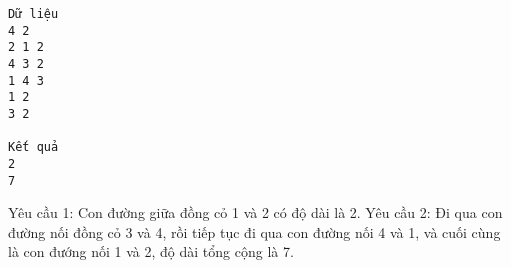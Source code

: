 \begin{verbatim}
Dữ liệu
4 2
2 1 2
4 3 2
1 4 3
1 2
3 2

Kết quả
2
7
\end{verbatim}
Yêu cầu 1: Con đường giữa đồng cỏ 1 và 2 có độ dài là 2. Yêu cầu 2: Đi qua con đường nối đồng cỏ 3 và 4, rồi tiếp tục đi qua con đường nối 4 và 1, và cuối cùng là con đướng nối 1 và 2, độ dài tổng cộng là 7.